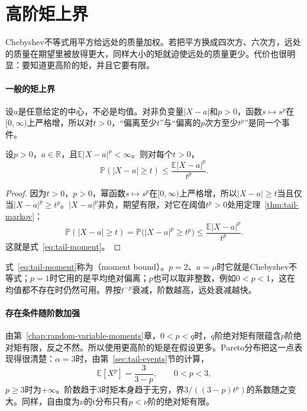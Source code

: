 \section{高阶矩上界}
\label{sec:tail-higher-moments}

Chebyshev不等式用平方给远处的质量加权。若把平方换成四次方、六次方，远处的质量在期望里被放得更大，同样大小的矩就迫使远处的质量更少。代价也很明显：要知道更高阶的矩，并且它要有限。

\paragraph{一般的矩上界}
设$a$是任意给定的中心，不必是均值。对非负变量$\lvert X-a\rvert$和$p>0$，函数$s\mapsto s^p$在$[0,\infty)$上严格增，所以对$t>0$，“偏离至少$t$”与“偏离的$p$次方至少$t^p$”是同一个事件。

\begin{theorem}[矩上界]
\label{thm:tail-moment}
设$p>0$，$a\in\mathbb{R}$，且$\mathbb{E}\lvert X-a\rvert^p<\infty$。则对每个$t>0$，
\begin{equation}
 \mathbb{P}(\lvert X-a\rvert\geq t)\leq\frac{\mathbb{E}\lvert X-a\rvert^p}{t^p} .
 \label{eq:tail-moment}
\end{equation}
\end{theorem}

\begin{proof}
因为$t>0$，$p>0$，幂函数$s\mapsto s^p$在$[0,\infty)$上严格增，所以$\lvert X-a\rvert\geq t$当且仅当$\lvert X-a\rvert^p\geq t^p$。$\lvert X-a\rvert^p$非负，期望有限，对它在阈值$t^p>0$处用定理~\ref{thm:tail-markov}：
\[
 \mathbb{P}(\lvert X-a\rvert\geq t)=\mathbb{P}\bigl(\lvert X-a\rvert^p\geq t^p\bigr)\leq\frac{\mathbb{E}\lvert X-a\rvert^p}{t^p} .
\]
这就是式~\eqref{eq:tail-moment}。
\end{proof}

式~\eqref{eq:tail-moment}称为（moment bound）。$p=2$、$a=\mu$时它就是Chebyshev不等式；$p=1$时它用的是平均绝对偏离；$p$也可以取非整数，例如$0<p<1$，这在均值都不存在时仍然可用。界按$t^{-p}$衰减，阶数越高，远处衰减越快。

\paragraph{存在条件随阶数加强}
由第~\ref{chap:random-variable-moments}章，$0<p<q$时，$q$阶绝对矩有限蕴含$p$阶绝对矩有限，反之不然。所以使用更高阶的矩是在假设更多。Pareto分布把这一点表现得很清楚：$\alpha=3$时，由第~\ref{sec:tail-events}节的计算，
\[
 \mathbb{E}[X^p]=\frac{3}{3-p},\qquad 0<p<3 ,
\]
$p\geq3$时为$+\infty$。阶数趋于$3$时矩本身趋于无穷，界$3/((3-p)t^p)$的系数随之变大。同样，自由度为$\nu$的t分布只有$p<\nu$阶的绝对矩有限。

